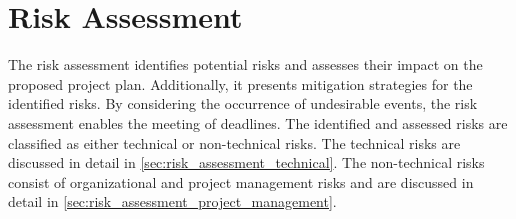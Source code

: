 \section{Risk Assessment}
\label{sec:risk_assessment}
The risk assessment identifies potential risks and assesses their impact on the proposed project plan.
Additionally, it presents mitigation strategies for the identified risks.
By considering the occurrence of undesirable events, the risk assessment enables the meeting of deadlines.
The identified and assessed risks are classified as either technical or non-technical risks.
The technical risks are discussed in detail in \autoref{sec:risk_assessment_technical}.
The non-technical risks consist of organizational and project management risks and are discussed in detail in \autoref{sec:risk_assessment_project_management}.

